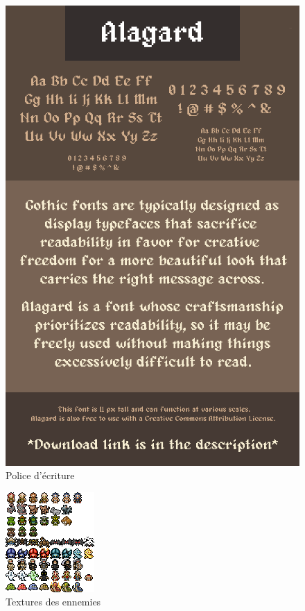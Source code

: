 \documentclass[a4paper,12pt]{article}
\begin{document}
\begin{figure}[hbt!]
    \centering
    \includegraphics[scale=0.3, angle=0]{images/fonts.png}
    \caption{Police d'écriture}
    \label{fig:fonts}
\end{figure}

\begin{figure}[hbt!]
    \centering
    \includegraphics[scale=2, angle=0]{images/texture_monstres1.png}
    \caption{Textures des ennemies}
    \label{fig:textEnnemis}
\end{figure}
\end{document}
